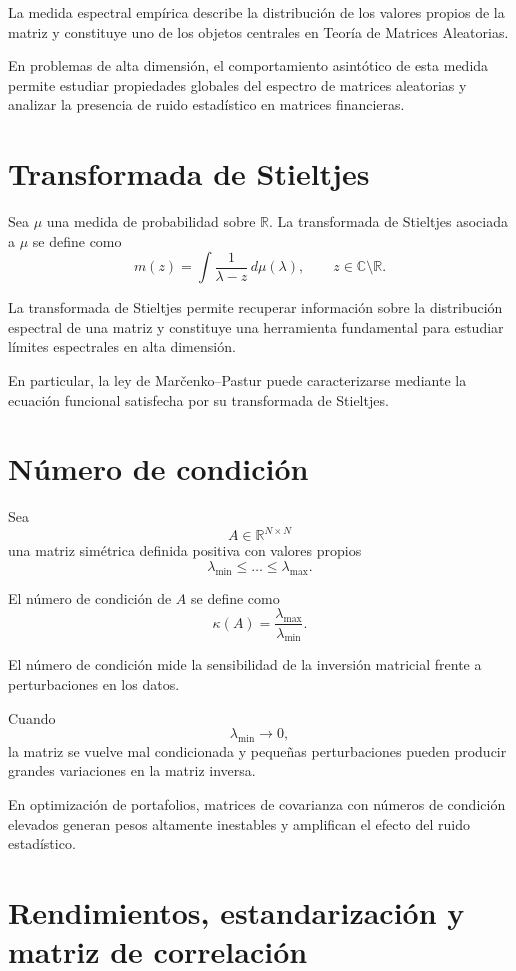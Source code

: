 \documentclass[letterpaper,12pt,oneside]{book}
\begin{document}
La medida espectral empírica describe la distribución de los valores propios de la matriz y constituye uno de los objetos centrales en Teoría de Matrices Aleatorias.

En problemas de alta dimensión, el comportamiento asintótico de esta medida permite estudiar propiedades globales del espectro de matrices aleatorias y analizar la presencia de ruido estadístico en matrices financieras.

\section{Transformada de Stieltjes}

Sea \(\mu\) una medida de probabilidad sobre \(\mathbb{R}\). La transformada de Stieltjes asociada a \(\mu\) se define como
\[
m(z)
=
\int
\frac{1}{\lambda-z}
\,d\mu(\lambda),
\qquad
z\in\mathbb{C}\setminus\mathbb{R}.
\]

La transformada de Stieltjes permite recuperar información sobre la distribución espectral de una matriz y constituye una herramienta fundamental para estudiar límites espectrales en alta dimensión.

En particular, la ley de Marčenko--Pastur puede caracterizarse mediante la ecuación funcional satisfecha por su transformada de Stieltjes.

\section{Número de condición}

Sea
\[
A\in\mathbb{R}^{N\times N}
\]
una matriz simétrica definida positiva con valores propios
\[
\lambda_{\min}
\leq
\dots
\leq
\lambda_{\max}.
\]

El número de condición de \(A\) se define como
\[
\kappa(A)
=
\frac{
\lambda_{\max}
}{
\lambda_{\min}
}.
\]

El número de condición mide la sensibilidad de la inversión matricial frente a perturbaciones en los datos.

Cuando
\[
\lambda_{\min}\to0,
\]
la matriz se vuelve mal condicionada y pequeñas perturbaciones pueden producir grandes variaciones en la matriz inversa.

En optimización de portafolios, matrices de covarianza con números de condición elevados generan pesos altamente inestables y amplifican el efecto del ruido estadístico.

\section{Rendimientos, estandarización y matriz de correlación}
\end{document}
